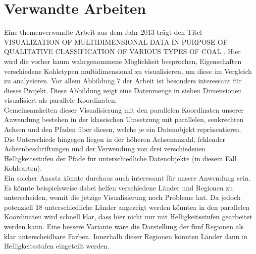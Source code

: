 \documentclass[usegeometry=true]{scrartcl}
\begin{document}
\section{Verwandte Arbeiten}
Eine themenverwandte Arbeit aus dem Jahr 2013 trägt den Titel \glqq VISUALIZATION OF MULTIDIMENSIONAL DATA IN PURPOSE OF QUALITATIVE CLASSIFICATION OF VARIOUS TYPES OF COAL\grqq{} \cite{coal}. Hier wird die vorher kaum wahrgenommene Möglichkeit besprochen, Eigenschaften verschiedene Kohletypen multidimensional zu visualisieren, um diese im Vergleich zu analysieren. Vor allem Abbildung 7 der Arbeit ist besonders interessant für dieses Projekt. Diese Abbildung zeigt eine Datenmenge in sieben Dimensionen visualisiert als parallele Koordinaten.\\ Gemeinsamkeiten dieser Visualisierung mit den parallelen Koordinaten unserer Anwendung bestehen in der klassischen Umsetzung mit parallelen, senkrechten Achsen und den Pfaden über diesen, welche je ein Datenobjekt repräsentieren. Die Unterschiede hingegen liegen in der höheren Achsenanzahl, fehlender Achsenbeschriftungen und der Verwendung von drei verschiedenen Helligkeitsstufen der Pfade für unterschiedliche Datenobjekte (in diesem Fall Kohlearten).\\ Ein solcher Ansatz könnte durchaus auch interessant für unsere Anwendung sein. Es könnte beispielsweise dabei helfen verschiedene Länder und Regionen zu unterscheiden, womit die jetzige Visualisierung noch Probleme hat. Da jedoch potenziell 18 unterschiedliche Länder angezeigt werden könnten in den parallelen Koordinaten wird schnell klar, dass hier nicht nur mit Helligkeitsstufen gearbeitet werden kann. Eine bessere Variante wäre die Darstellung der fünf Regionen als klar unterscheidbare Farben. Innerhalb dieser Regionen könnten Länder dann in Helligkeitsstufen eingeteilt werden.\\
\end{document}
